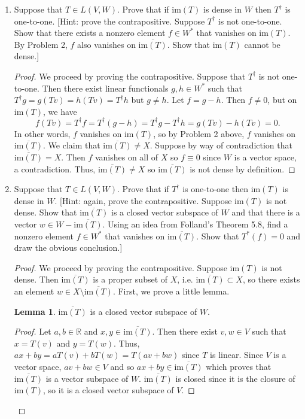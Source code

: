 \documentclass[11pt,oneside,english]{amsart}
\theoremstyle{definition}
\newtheorem*{lemma}{Lemma}
\newcommand{\MB}[1]{\mathbb{#1}}
\begin{document}
\begin{enumerate}
\item Suppose that $T \in L(V,W)$.  Prove that if $\text{im}(T)$ is dense in $W$ then $T^\dagger$ is one-to-one. [Hint: prove the contrapositive. Suppose $T^\dagger$ is not one-to-one. Show that there exists a nonzero element $f \in W^*$ that vanishes on $\text{im}(T)$. By Problem 2, $f$ also vanishes on $\overline{\text{im}(T)}$.  Show that $\text{im}(T)$ cannot be dense.]

\begin{proof}
We proceed by proving the contrapositive. Suppose that $T^\dagger$ is not one-to-one. Then there exist linear functionals $g,h\in W^*$ such that $T^\dagger g=g(Tv)=h(Tv)=T^\dagger h$ but $g\neq h$. Let $f=g-h$. Then $f\neq0$, but on $\text{im}(T)$, we have 
\[
f(Tv)=T^\dagger f=T^\dagger(g-h)=T^\dagger g-T^\dagger h=g(Tv)-h(Tv)=0.
\]
In other words, $f$ vanishes on $\text{im}(T)$, so by Problem 2 above, $f$ vanishes on $\overline{\text{im}(T)}$. We claim that $\overline{\text{im}(T)}\neq X$. Suppose by way of contradiction that $\overline{\text{im}(T)}= X$. Then $f$ vanishes on all of $X$ so $f\equiv 0$ since $W$ is a vector space, a contradiction. Thus, $\overline{\text{im}(T)}\neq X$ so $\overline{\text{im}(T)}$ is not dense by definition.
\end{proof}

\item Suppose that $T \in L(V,W)$.  Prove that if $T^\dagger$ is one-to-one then $\text{im}(T)$ is dense in $W$. [Hint: again, prove the contrapositive.  Suppose $\text{im}(T)$ is not dense. Show that $\overline{\text{im}(T)}$ is a closed vector subspace of $W$ and that there is a vector $w \in W - \overline{\text{im}(T)}$.  Using an idea from Folland's Theorem 5.8, find a nonzero element $f \in W^*$ that vanishes on $\overline{\text{im}(T)}$.  Show that $T^*(f) = 0$ and draw the obvious conclusion.]


\begin{proof}
We proceed by proving the contrapositive. Suppose $\text{im}(T)$ is not dense. Then $\overline{\text{im}(T)}$ is a proper subset of $X$, i.e. $\overline{\text{im}(T)}\subset X$, so there exists an element $w\in X\setminus \overline{\text{im}(T)}$. First, we prove a little lemma.

\begin{lemma}
 $\overline{\text{im}(T)}$ is a closed vector subspace of $W$.
\end{lemma}

\begin{proof}
Let $a,b\in\MB{R}$ and $x,y\in  \overline{\text{im}(T)}$. Then there exist $v,w\in V$ such that $x=T(v)$ and $y=T(w)$. Thus, $ax+by=aT(v)+bT(w)=T(av+bw)$ since $T$ is linear. Since $V$ is a vector space, $av+bw\in V$ and so $ax+by\in\overline{\text{im}(T)}$ which proves that $\overline{\text{im}(T)}$ is a vector subspace of $W$. $\overline{\text{im}(T)}$ is closed since it is the closure of $\text{im}(T)$, so it is a closed vector subspace of $V$. 
\end{proof}


\end{proof}
\end{enumerate}
\end{document}
